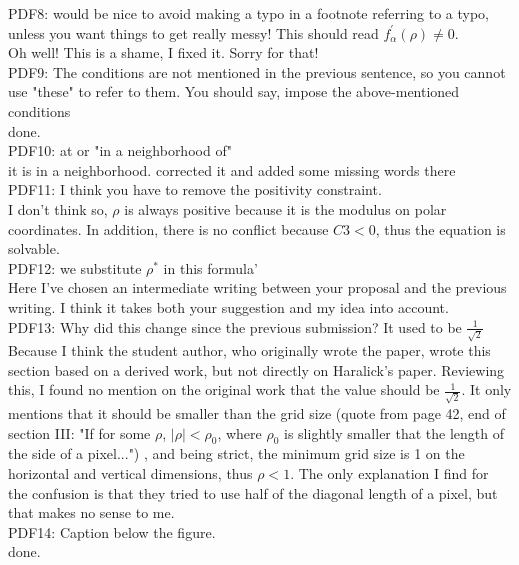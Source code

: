 \documentclass[a4paper,10pt]{report}
\begin{document}
\que PDF8:  would be nice to avoid making a typo in a footnote referring to a typo, unless you want things to get really messy! This should read $f_\alpha^{'}(\rho)\neq 0$.\\
\ans Oh well! This is a shame, I fixed it. Sorry for that!\\

\que PDF9: The conditions are not mentioned in the previous sentence, so you cannot use "these" to refer to them. You should say, impose the above-mentioned conditions\\
\ans done.\\

\que PDF10: at or "in a neighborhood of"\\
\ans it is in a neighborhood. corrected it and added some missing words there\\

\que PDF11: I think you have to remove the positivity constraint. \\
\ans I don't think so, $\rho$ is always positive because it is the modulus on polar coordinates. In addition, there is no conflict because $C3<0$, thus the equation is solvable.\\

\que PDF12: we substitute $\rho^*$ in this formula'\\
\ans Here I've chosen an intermediate writing between your proposal and the previous writing. I think it takes both your suggestion and my idea into account.\\

\que PDF13: Why did this change since the previous submission? It used to  be $\frac 1{\sqrt 2}$\\
\ans Because I think the student author, who originally wrote the paper, wrote this section based on a derived work, but not directly on Haralick's paper. Reviewing this, I found no mention on the original work that the value should be $\frac 1{\sqrt 2}$. It only mentions that it should be smaller than the grid size (quote from page 42, end of section III: "If for some $\rho$, $|\rho|<\rho_0$, where $\rho_0$ is slightly smaller that the length of the side of a pixel...") , and being strict, the minimum grid size is 1 on the horizontal and vertical dimensions, thus $\rho<1$. The only explanation I find for the confusion is that they tried to use half of the diagonal length of a pixel, but that makes no sense to me.\\

\que PDF14: Caption below the figure.\\
\ans done.\\
\end{document}
